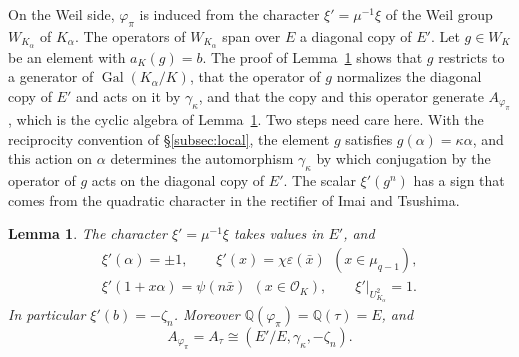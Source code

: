 \documentclass[a4paper,11pt]{amsart}
\newtheorem{lemma}[theorem]{Lemma}
\theoremstyle{definition}
\theoremstyle{remark}
\numberwithin{equation}{section}
\newcommand{\Q}{\mathbb{Q}}
\DeclareMathOperator{\Gal}{Gal}
\begin{document}
On the Weil side, $\varphi_\pi$ is induced from the character $\xi'=\mu^{-1}\xi$ of the Weil group $W_{K_\alpha}$ of $K_\alpha$. The operators of $W_{K_\alpha}$ span over $E$ a diagonal copy of $E'$. Let $g\in W_K$ be an element with $a_K(g)=b$. The proof of Lemma~\ref{lem:weil-side} shows that $g$ restricts to a generator of $\Gal(K_\alpha/K)$, that the operator of $g$ normalizes the diagonal copy of $E'$ and acts on it by $\gamma_\kappa$, and that the copy and this operator generate $A_{\varphi_\pi}$, which is the cyclic algebra of Lemma~\ref{lem:weil-side}. Two steps need care here. With the reciprocity convention of \S\ref{subsec:local}, the element $g$ satisfies $g(\alpha)=\kappa\alpha$, and this action on $\alpha$ determines the automorphism $\gamma_\kappa$ by which conjugation by the operator of $g$ acts on the diagonal copy of $E'$. The scalar $\xi'(g^n)$ has a sign that comes from the quadratic character in the rectifier of Imai and Tsushima.

\begin{lemma}\label{lem:weil-side}
The character $\xi'=\mu^{-1}\xi$ takes values in $E'$, and
\begin{gather*}
 \xi'(\alpha)=\pm1,\qquad \xi'(x)=\chi\varepsilon(\bar x)\ \ (x\in\mu_{q-1}),\\
 \xi'(1+x\alpha)=\psi(n\bar x)\ \ (x\in\mathcal O_K),\qquad \xi'|_{U^2_{K_\alpha}}=1.
\end{gather*}
In particular $\xi'(b)=-\zeta_n$. Moreover $\Q(\varphi_\pi)=\Q(\tau)=E$, and
\[
 A_{\varphi_\pi}=A_\tau\cong(E'/E,\gamma_\kappa,-\zeta_n).
\]
\end{lemma}
\end{document}
